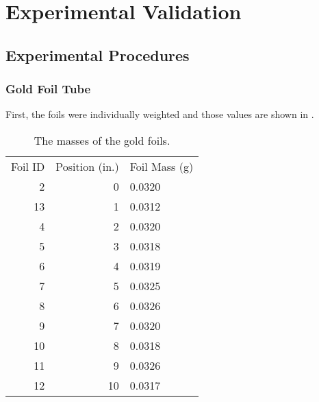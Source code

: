 
\cleardoublepage


\chapter{Experimental Validation}


\section{Experimental Procedures}


\subsection{Gold Foil Tube}

First, the foils were individually weighted and those values are shown in .


\begin{table}[h]\centering
\label{tab:au_masses}
\caption{The masses of the gold foils.}
\begin{tabular}{ r | r | l }
\toprule
Foil ID  & Position (in.)     &   Foil Mass (g)\\
2 & 0 & 0.0320\\
13 & 1 & 0.0312\\
4 & 2 & 0.0320\\
5 & 3 & 0.0318\\
6 & 4 & 0.0319\\
7 & 5 & 0.0325\\
8 & 6 & 0.0326\\
9 & 7 & 0.0320\\
10 & 8 & 0.0318\\
11 & 9 & 0.0326\\
12 & 10 & 0.0317\\
\end{tabular}
\end{table}

